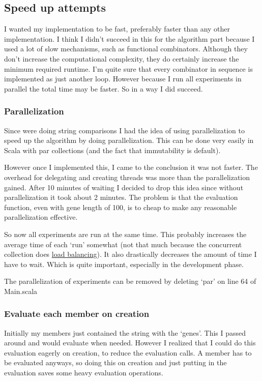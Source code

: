 \documentclass{article}
\begin{document}
\begin{empfile}
\subsection{Speed up attempts}
I wanted my implementation to be fast, preferably faster than any other
implementation. I think I didn't succeed in this for the algorithm part
because I used a lot of slow mechanisms, such as functional combinators.
Although they don't increase the computational complexity,
they do certainly increase
the minimum required runtime. I'm quite sure that every combinator in sequence
is implemented as just another loop. However because I
run all experiments in parallel the total time may be faster. So in a way
I did succeed.

\subsubsection{Parallelization}
Since were doing string comparisons I had the idea of using parallelization to
speed up the algorithm by doing parallelization. This can be done very easily
in Scala with par collections (and the fact that immutability is default).

However once I implemented this, I came to the conclusion it was not faster.
The overhead for delegating and creating threads was more than the parallelization
gained.  After 10 minutes of waiting I decided to drop this idea
since without parallelization it took about 2 minutes.
The problem is that the evaluation function, even with gene length of 100, is
to cheap to make any reasonable parallelization effective.

So now all experiments are run at the same time. This probably increases the
average time of each `run' somewhat (not that much because the concurrent
collection does \href{http://docs.scala-lang.org/overviews/parallel-collections/configuration.html}{load balancing}).
It also drastically decreases the amount of time I have to wait. Which is quite
important, especially in the development phase.

The parallelization of experiments can be removed by deleting `par' on line 64
of Main.scala

\subsubsection{Evaluate each member on creation}
Initially my members just contained the string with the `genes'. This I passed
around and would evaluate when needed. However I realized that I could do this
evaluation eagerly on creation, to reduce the evaluation calls. A member has
to be evaluated anyways, so doing this on creation and just putting in the
evaluation saves some heavy evaluation operations.


\end{empfile}
\end{document}
